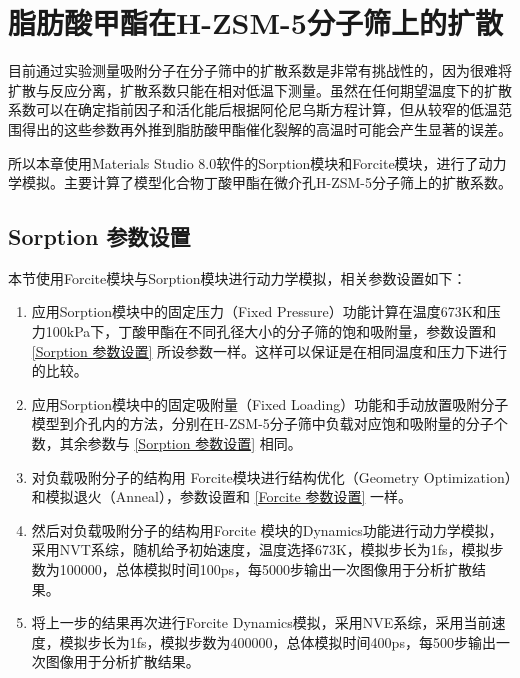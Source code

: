 \newpage
\section{脂肪酸甲酯在H-ZSM-5分子筛上的扩散}
\par{目前通过实验测量吸附分子在分子筛中的扩散系数是非常有挑战性的，因为很难将扩散与反应分离，扩散系数只能在相对低温下测量。虽然在任何期望温度下的扩散系数可以在确定指前因子和活化能后根据阿伦尼乌斯方程计算，但从较窄的低温范围得出的这些参数再外推到脂肪酸甲酯催化裂解的高温时可能会产生显著的误差\cite{bu2018diffusion}。}
\par{所以本章使用Materials Studio 8.0软件的Sorption模块和Forcite模块，进行了动力学模拟。主要计算了模型化合物丁酸甲酯在微介孔H-ZSM-5分子筛上的扩散系数。}
\subsection{Sorption 参数设置}\label{Sorption 扩散参数设置}
\par{本节使用Forcite模块与Sorption模块进行动力学模拟，相关参数设置如下：}
\begin{enumerate}
    \item 应用Sorption模块中的固定压力（Fixed Pressure）功能计算在温度673K和压力100kPa下，丁酸甲酯在不同孔径大小的分子筛的饱和吸附量，参数设置和 \ref{Sorption 参数设置} 所设参数一样。这样可以保证是在相同温度和压力下进行的比较。
    \item 应用Sorption模块中的固定吸附量（Fixed Loading）功能和手动放置吸附分子模型到介孔内的方法，分别在H-ZSM-5分子筛中负载对应饱和吸附量的分子个数，其余参数与 \ref{Sorption 参数设置} 相同。
    \item 对负载吸附分子的结构用 Forcite模块进行结构优化（Geometry Optimization）和模拟退火（Anneal），参数设置和 \ref{Forcite 参数设置} 一样。
    \item 然后对负载吸附分子的结构用Forcite 模块的Dynamics功能进行动力学模拟，采用NVT系综，随机给予初始速度，温度选择673K，模拟步长为1fs，模拟步数为100000，总体模拟时间100ps，每5000步输出一次图像用于分析扩散结果。
    \item 将上一步的结果再次进行Forcite Dynamics模拟，采用NVE系综，采用当前速度，模拟步长为1fs，模拟步数为400000，总体模拟时间400ps，每500步输出一次图像用于分析扩散结果。
\end{enumerate}

